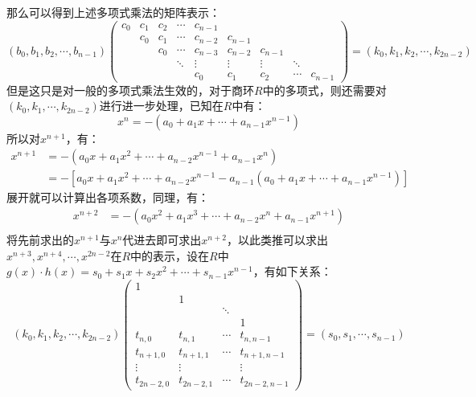 \documentclass{book}
\numberwithin{equation}{subsubsection}
\begin{document}
那么可以得到上述多项式乘法的矩阵表示：
\begin{equation}
    (b_0,b_1,b_2,\cdots,b_{n-1})
    \left(\begin{matrix}
        c_0&c_1&c_2&\cdots&c_{n-1}\\
        &c_0&c_1&\cdots&c_{n-2}&c_{n-1}\\
        &&c_0&\cdots&c_{n-3}&c_{n-2}&c_{n-1}\\
        &&&\ddots&\vdots&\vdots&\vdots&\ddots\\
        &&&&c_{0}&c_1&c_2&\cdots&c_{n-1}
    \end{matrix}\right)=(k_0,k_1,k_2,\cdots,k_{2n-2})
    \nonumber
\end{equation}
但是这只是对一般的多项式乘法生效的，对于商环$R$中的多项式，则还需要对$(k_0,k_1,\cdots,k_{2n-2})$进行进一步处理，已知在$R$中有：
\begin{equation}
    x^{n}=-(a_0+a_1x+\cdots+a_{n-1}x^{n-1})
    \nonumber
\end{equation}
所以对$x^{n+1}$，有：
\begin{equation}
    \begin{aligned}
        x^{n+1}&=-(a_0x+a_1x^2+\cdots+a_{n-2}x^{n-1}+a_{n-1}x^{n})\\
        &=-[a_0x+a_1x^2+\cdots+a_{n-2}x^{n-1}-a_{n-1}(a_0+a_1x+\cdots+a_{n-1}x^{n-1})]
    \end{aligned}
    \nonumber
\end{equation}
展开就可以计算出各项系数，同理，有：
\begin{equation}
    \begin{aligned}
        x^{n+2}&=-(a_0x^2+a_1x^3+\cdots+a_{n-2}x^{n}+a_{n-1}x^{n+1})\\
    \end{aligned}
    \nonumber
\end{equation}
将先前求出的$x^{n+1}$与$x^n$代进去即可求出$x^{n+2}$，以此类推可以求出$x^{n+3},x^{n+4},\cdots,x^{2n-2}$在$R$中的表示，设在$R$中$g(x)\cdot h(x)=s_0+s_1x+s_2x^2+\cdots+s_{n-1}x^{n-1}$，有如下关系：
\begin{equation}
    (k_0,k_1,k_2,\cdots,k_{2n-2})
    \left(\begin{matrix}
        1&&&\\
        &1&&\\
        &&\ddots\\
        &&&1\\
        t_{n,0}&t_{n,1}&\cdots&t_{n,n-1}\\
        t_{n+1,0}&t_{n+1,1}&\cdots&t_{n+1,n-1}\\
        \vdots&\vdots&&\vdots\\
        t_{2n-2,0}&t_{2n-2,1}&\cdots&t_{2n-2,n-1}
    \end{matrix}\right)=(s_0,s_1,\cdots,s_{n-1})
    \nonumber
\end{equation}
\end{document}
